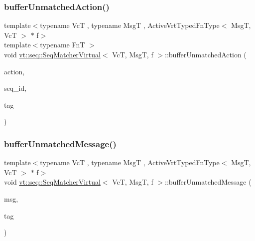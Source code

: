 \subsubsection{\texorpdfstring{buffer\+Unmatched\+Action()}{bufferUnmatchedAction()}}
{\footnotesize\ttfamily template$<$typename VcT , typename MsgT , Active\+Vrt\+Typed\+Fn\+Type$<$ Msg\+T, Vc\+T $>$ $\ast$ f$>$ \\
template$<$typename FnT $>$ \\
void \hyperlink{structvt_1_1seq_1_1_seq_matcher_virtual}{vt\+::seq\+::\+Seq\+Matcher\+Virtual}$<$ VcT, MsgT, f $>$\+::buffer\+Unmatched\+Action (\begin{DoxyParamCaption}\item[{FnT}]{action,  }\item[{\hyperlink{namespacevt_1_1seq_a3b612da217ac669d39c159f134ab8434}{Seq\+Type} const \&}]{seq\+\_\+id,  }\item[{\hyperlink{namespacevt_a84ab281dae04a52a4b243d6bf62d0e52}{Tag\+Type} const \&}]{tag }\end{DoxyParamCaption})\hspace{0.3cm}{\ttfamily [static]}}

\mbox{\label{structvt_1_1seq_1_1_seq_matcher_virtual_a60dd673159850b4dea0b0d5e69f2ddef}} 
\subsubsection{\texorpdfstring{buffer\+Unmatched\+Message()}{bufferUnmatchedMessage()}}
{\footnotesize\ttfamily template$<$typename VcT , typename MsgT , Active\+Vrt\+Typed\+Fn\+Type$<$ Msg\+T, Vc\+T $>$ $\ast$ f$>$ \\
void \hyperlink{structvt_1_1seq_1_1_seq_matcher_virtual}{vt\+::seq\+::\+Seq\+Matcher\+Virtual}$<$ VcT, MsgT, f $>$\+::buffer\+Unmatched\+Message (\begin{DoxyParamCaption}\item[{\hyperlink{namespacevt_ab2b3d506ec8e8d1540aede826d84a239}{Msg\+Shared\+Ptr}$<$ MsgT $>$}]{msg,  }\item[{\hyperlink{namespacevt_a84ab281dae04a52a4b243d6bf62d0e52}{Tag\+Type} const \&}]{tag }\end{DoxyParamCaption})\hspace{0.3cm}{\ttfamily [static]}}

